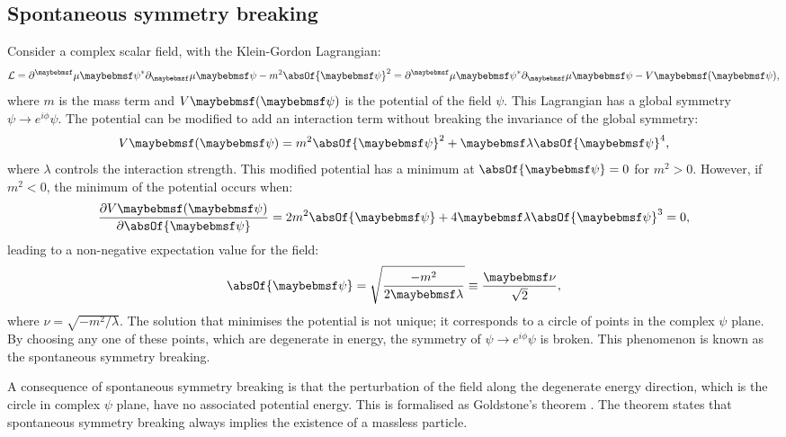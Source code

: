 


\subsection{Spontaneous symmetry breaking}

Consider a complex scalar field, with the Klein-Gordon Lagrangian:
\begin{equation}
\Lagr = \partial^\mu{\psi}^*\partial_\mu\psi - m^2 \absOf{\psi}^2 =  \partial^\mu{\psi}^*\partial_\mu\psi - V\parenths{\psi} ,
\label{eq:theoryKGLagrangian}
\end{equation}
where $m$ is the mass term and $V\parenths{\psi} $ is the potential of the field $\psi$. This Lagrangian has a global symmetry $\psi \to e^{i\phi}\psi$. The potential can be modified to add an interaction term without breaking the  invariance of the global symmetry:
\begin{equation}
V\parenths{\psi} =  m^2 \absOf{\psi}^2 + \lambda\absOf{\psi}^4,
\end{equation}
where $\lambda$ controls the interaction strength. This modified potential has a minimum at $ \absOf{\psi}=0$ for $m^2>0$. However, if $m^2<0$, the minimum of the potential occurs when:
\begin{equation}
\frac{\partial{V}\parenths{\psi}}{\partial{\absOf{\psi}}} =  2 m^2 \absOf{\psi} + 4\lambda\absOf{\psi}^3 = 0,
\end{equation}
leading to a non-negative expectation value for the field:
\begin{equation}
\absOf{\psi} = \sqrt{\frac{-m^2}{2\lambda}}\equiv \frac{\nu}{\sqrt{2}},
\end{equation}
where $\nu = \sqrt{-m^2/\lambda}$. The solution that minimises the potential is not unique; it corresponds to a circle of points in the complex $\psi$ plane. By choosing any one of these points, which are degenerate in energy, the symmetry of   $\psi \to e^{i\phi}\psi$ is broken. This phenomenon is known as the spontaneous symmetry breaking.

A consequence of  spontaneous symmetry breaking is that the perturbation of the field along the degenerate energy direction, which is the circle in complex $\psi$ plane, have no associated potential energy. This is formalised as Goldstone's theorem \cite{Nambu:1960tm,Goldstone:1961eq}. The theorem states that spontaneous symmetry breaking always implies the existence of a massless particle.

